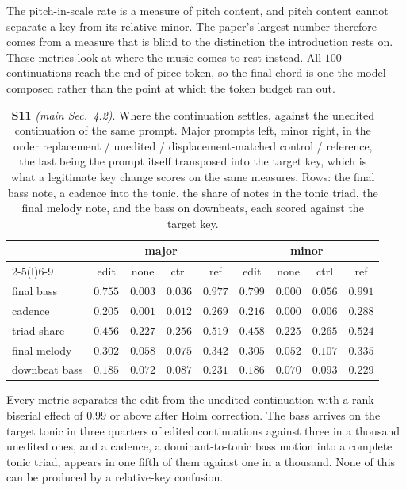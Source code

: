 \documentclass{article}
\begin{document}
The pitch-in-scale rate is a measure of pitch content, and pitch content cannot separate a
key from its relative minor. The paper's largest number therefore comes from a measure
that is blind to the distinction the introduction rests on. These metrics look at where
the music comes to rest instead. All $100$ continuations reach the end-of-piece token,
so the final chord is one the model composed rather than the point at which the token
budget ran out.

\begin{table}[!t]
\centering
\caption{\textbf{S11} \textit{(main Sec.~4.2)}. Where the continuation settles, against
the unedited continuation of the same prompt. Major prompts left, minor right, in the
order replacement / unedited / displacement-matched control / reference, the last being the
prompt itself transposed into the target key, which is what a legitimate key change
scores on the same measures. Rows: the final bass note, a cadence into the tonic, the share
of notes in the tonic triad, the final melody note, and the bass on downbeats, each
scored against the target key.}
\label{tab:supp-tonic}
\scriptsize
\setlength{\tabcolsep}{1.8pt}
\begin{tabular}{@{}lcccc@{\hskip 4pt}cccc@{}}
\toprule
& \multicolumn{4}{c}{major} & \multicolumn{4}{c}{minor}\\
\cmidrule(r){2-5}\cmidrule(l){6-9}
& edit & none & ctrl & ref & edit & none & ctrl & ref\\
\midrule
final bass  & $0.755$ & $0.003$ & $0.036$ & $0.977$ & $0.799$ & $0.000$ & $0.056$ & $0.991$\\
cadence     & $0.205$ & $0.001$ & $0.012$ & $0.269$ & $0.216$ & $0.000$ & $0.006$ & $0.288$\\
triad share & $0.456$ & $0.227$ & $0.256$ & $0.519$ & $0.458$ & $0.225$ & $0.265$ & $0.524$\\
final melody& $0.302$ & $0.058$ & $0.075$ & $0.342$ & $0.305$ & $0.052$ & $0.107$ & $0.335$\\
downbeat bass& $0.185$ & $0.072$ & $0.087$ & $0.231$ & $0.186$ & $0.070$ & $0.093$ & $0.229$\\
\bottomrule
\end{tabular}
\end{table}

Every metric separates the edit from the unedited continuation with a rank-biserial
effect of $0.99$ or above after Holm correction. The bass arrives on the target
tonic in three quarters of edited continuations against three in a thousand unedited
ones, and a cadence, a dominant-to-tonic bass motion into a complete tonic triad,
appears in one fifth of them against one in a thousand. None of this can be produced by
a relative-key confusion.
\end{document}
